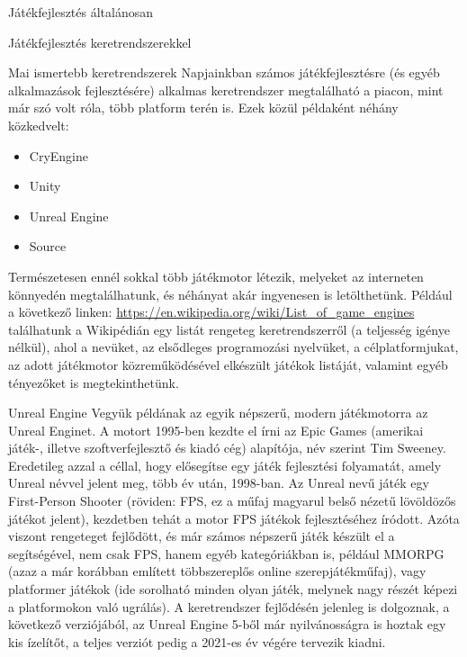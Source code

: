 \begin{MyChapter}{Játékfejlesztés általánosan}
\begin{MySection}{Játékfejlesztés keretrendszerekkel}
		\begin{MySubSection}{Mai ismertebb keretrendszerek}
		Napjainkban számos játékfejlesztésre (és egyéb alkalmazások fejlesztésére) alkalmas keretrendszer megtalálható a piacon, mint már szó volt róla, több platform terén is.
		\newline \newline
		Ezek közül példaként néhány közkedvelt:
		\begin{itemize}
			\item CryEngine
			\item Unity
			\item Unreal Engine
			\item Source
		\end{itemize}
		Természetesen ennél sokkal több játékmotor létezik, melyeket az interneten könnyedén megtalálhatunk, és néhányat akár ingyenesen is letölthetünk.
		Például a következő linken: \url{https://en.wikipedia.org/wiki/List\_of\_game\_engines} találhatunk a Wikipédián egy listát rengeteg keretrendszerről (a teljesség igénye nélkül), ahol a nevüket, az elsődleges programozási nyelvüket, a célplatformjukat, az adott játékmotor közreműködésével elkészült játékok listáját, valamint egyéb tényezőket is megtekinthetünk.
		\end{MySubSection}
		
		\begin{MySubSection}{Unreal Engine}
		Vegyük példának az egyik népszerű, modern játékmotorra az Unreal Enginet. A motort 1995-ben kezdte el írni az Epic Games (amerikai játék-, illetve szoftverfejlesztő és kiadó cég) alapítója, név szerint Tim Sweeney. Eredetileg azzal a céllal, hogy elősegítse egy játék fejlesztési folyamatát, amely Unreal névvel jelent meg, több év után, 1998-ban. Az Unreal nevű játék egy First-Person Shooter (röviden: FPS, ez a műfaj magyarul belső nézetű lövöldözős játékot jelent), kezdetben tehát a motor FPS játékok fejlesztéséhez íródott. Azóta viszont rengeteget fejlődött, és már számos népszerű játék készült el a segítségével, nem csak FPS, hanem egyéb kategóriákban is, például MMORPG (azaz a már korábban említett többszereplős online szerepjátékműfaj), vagy platformer játékok (ide sorolható minden olyan játék, melynek nagy részét képezi a platformokon való ugrálás). A keretrendszer fejlődésén jelenleg is dolgoznak, a következő verziójából, az Unreal Engine 5-ből már nyilvánosságra is hoztak egy kis ízelítőt, a teljes verziót pedig a 2021-es év végére tervezik kiadni.
		

\end{MySubSection}
\end{MySection}
\end{MyChapter}
